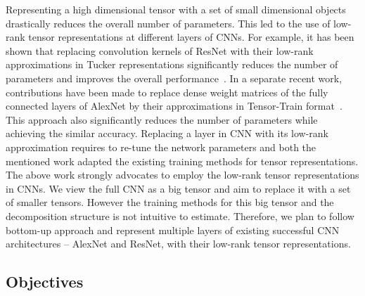 Representing a high dimensional tensor with a set of small dimensional objects drastically reduces the overall number of parameters. This led to the use of low-rank tensor representations at different layers of CNNs. For example, it has been shown that replacing convolution kernels of ResNet with their low-rank approximations in Tucker representations significantly reduces the number of parameters and improves the overall performance~\cite{PSSEG+-ECCV2020}. In a separate recent work, contributions have been made to replace dense weight matrices of the fully connected layers of AlexNet by their approximations in Tensor-Train format~\cite{NPOV-NIPS2015}. This approach also significantly reduces the number of parameters while achieving the similar accuracy. Replacing a layer in CNN with its low-rank approximation requires to re-tune the network parameters and both the mentioned work adapted the existing training methods for tensor representations. The above work strongly advocates to employ the low-rank tensor representations in CNNs. We view the full CNN as a big tensor and aim to replace it with a set of smaller tensors. However the training methods for this big tensor and the decomposition structure is not intuitive to estimate. Therefore, we plan to follow bottom-up approach and represent multiple layers of existing successful CNN architectures -- AlexNet and ResNet, with their low-rank tensor representations.






%	


\subsection*{Objectives}
%


